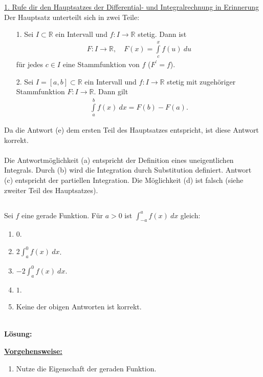 \underline{1. Rufe dir den Hauptsatzes der Differential- und Integralrechnung in Erinnerung}\\
Der Hauptsatz unterteilt sich in zwei Teile:
\begin{enumerate}
	\item[1.] 
	Sei $I \subset \mathbb{R}  $ ein Intervall und $f : I \to \mathbb{R}$ stetig.
	Dann ist
	\begin{align*}
		F : I \to \mathbb{R}, \quad F(x) = \int \limits_{c}^x f(u) \ du
	\end{align*}
	für jedes $c \in I $ eine Stammfunktion von $f$ ($F^\prime = f$).
	\item[2.]
	Sei $I = [a,b] \subset \mathbb{R} $ ein Intervall und $f: I \to \mathbb{R}$ stetig mit zugehöriger Stammfunktion $F : I \to \mathbb{R}$. Dann gilt
	\begin{align*}
		\int \limits_a^b f(x) \ dx = F(b) - F(a).
	\end{align*}
\end{enumerate}
Da die Antwort (e) dem ersten Teil des Hauptsatzes entspricht, ist diese Antwort korrekt.\\
\\
Die Antwortmöglichkeit (a) entspricht der Definition eines uneigentlichen Integrals.
Durch (b) wird die Integration durch Substitution definiert. Antwort (c) entspricht der partiellen Integration. 
Die Möglichkeit (d) ist falsch (siehe zweiter Teil des Hauptsatzes). 


\newpage

\subsection*{}
Sei $ f $ eine gerade Funktion.
Für $a > 0$ ist $\int_{-a}^a f(x) \ dx$ gleich:
\renewcommand{\labelenumi}{(\alph{enumi})}
\begin{enumerate}
	\item 
	$ 0 $.
	\item
	$ 2 \int_a^0 f(x) \ dx $.
	\item
	$ -2  \int_a^0 f(x) \ dx$.
	\item
	$ 1 $.
	\item
	Keine der obigen Antworten ist korrekt.
\end{enumerate}
\ \\
\textbf{Lösung:}
\begin{mdframed}
\underline{\textbf{Vorgehensweise:}}
\renewcommand{\labelenumi}{\theenumi.}
\begin{enumerate}
\item Nutze die Eigenschaft der geraden Funktion.
\end{enumerate}
\end{mdframed}


